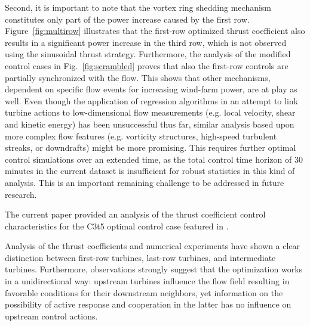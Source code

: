 \documentclass[wes, manuscript]{copernicus}
\begin{document}
Second, it is important to note that the vortex ring shedding mechanism constitutes only part of the power increase caused by the first row. Figure~\ref{fig:multirow} illustrates that the first-row optimized thrust coefficient also results in a significant power increase in the third row, which is not observed using the sinusoidal thrust strategy. Furthermore, the analysis of the modified control cases in Fig.~\ref{fig:scrambled} proves that also the first-row controls are partially synchronized with the flow. This shows that other mechanisms, dependent on specific flow events for increasing wind-farm power, are at play as well. Even though the application of regression algorithms in an attempt to link turbine actions to low-dimensional flow measurements (e.g. local velocity, shear and kinetic energy) has been unsuccessful thus far, similar analysis based upon more complex flow features (e.g. vorticity structures, high-speed turbulent streaks, or downdrafts) might be more promising. This requires further optimal control simulations over an extended time, as the total control time horizon of 30 minutes in the current dataset is insufficient for robust statistics in this kind of analysis. This is an important remaining challenge to be addressed in future research. 

\conclusions \label{sec:analysis_summ}
The current paper provided an analysis of the thrust coefficient control characteristics for the C3t5 optimal control case featured in \cite{munters2017optimal}. 

Analysis of the thrust coefficients and numerical experiments have shown a clear distinction between first-row turbines, last-row turbines, and intermediate turbines. Furthermore, observations strongly suggest that the optimization works in a unidirectional way: upstream turbines influence the flow field resulting in favorable conditions for their downstream neighbors, yet information on the possibility of active response and cooperation in the latter has no influence on upstream control actions. 
\end{document}
